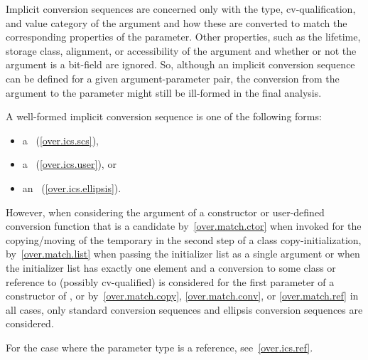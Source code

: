\pnum
Implicit conversion sequences are concerned only with the type,
cv-qualification, and value category of the argument and how these
are converted to match the corresponding properties of the
parameter.
Other properties, such as the lifetime, storage class,
alignment, or accessibility of the argument and whether or not
the argument is a bit-field are ignored.
So, although an implicit
conversion sequence can be defined for a given argument-parameter
pair, the conversion from the argument to the parameter might still
be ill-formed in the final analysis.

\pnum
A
well-formed implicit conversion
sequence is one of the following forms:

\begin{itemize}
\item
a
~(\ref{over.ics.scs}),
\item
a
~(\ref{over.ics.user}), or
\item
an
~(\ref{over.ics.ellipsis}).
\end{itemize}

\pnum
However, when considering the argument of a constructor or user-defined conversion function
that is a candidate by~\ref{over.match.ctor} when invoked for the copying/moving of the
temporary in the second step of a class copy-initialization, by~\ref{over.match.list} when passing
the initializer list as a single argument or when the initializer list has exactly one element and a
conversion to some class  or reference to (possibly cv-qualified)  is considered
for the first parameter of a constructor of , or by~\ref{over.match.copy},
\ref{over.match.conv}, or \ref{over.match.ref} in all cases, only standard conversion sequences and
ellipsis conversion sequences are considered.

\pnum
For the case where the parameter type is a reference, see~\ref{over.ics.ref}.

